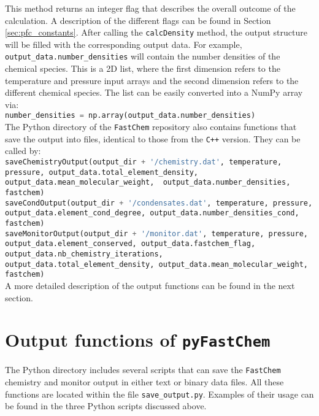 \documentclass[numbers=noenddot]{aux/fcmanual}
\newcommand{\fc}{\texttt{FastChem}\xspace}
\newcommand{\pfc}{\texttt{pyFastChem}\xspace}
\newcommand{\cpp}{\ttt{C++}\xspace}
\newcommand{\ttt}[1]{\texttt {#1}}
\begin{document}
This method returns an integer flag that describes the overall outcome of the calculation. A description of the different flags can be found in Section \ref{sec:pfc_constants}. After calling the \lstinline[language=Python]!calcDensity! method, the output structure will be filled with the corresponding output data. For example, \\
\lstinline[language=Python]!output_data.number_densities!
will contain the number densities of the chemical species. This is a 2D list, where the first dimension refers to the temperature and pressure input arrays and the second dimension refers to the different chemical species. The list can be easily converted into a NumPy array via:\\

\lstinline[language=Python]!number_densities = np.array(output_data.number_densities)!\\

The Python directory of the \fc repository also contains functions that save the output into files, identical to those from the \cpp version. They can be called by:\\

\lstinline[language=Python, breaklines, breakatwhitespace]!saveChemistryOutput(output_dir + '/chemistry.dat', temperature, pressure, output_data.total_element_density, output_data.mean_molecular_weight,  output_data.number_densities, fastchem)!\\

\lstinline[language=Python, breaklines, breakatwhitespace]!saveCondOutput(output_dir + '/condensates.dat', temperature, pressure, output_data.element_cond_degree, output_data.number_densities_cond, fastchem)!\\

\lstinline[language=Python, breaklines, breakatwhitespace]!saveMonitorOutput(output_dir + '/monitor.dat', temperature, pressure, output_data.element_conserved, output_data.fastchem_flag, output_data.nb_chemistry_iterations, output_data.total_element_density, output_data.mean_molecular_weight, fastchem)!\\

A more detailed description of the output functions can be found in the next section.


\section{Output functions of \pfc}

The Python directory includes several scripts that can save the \fc chemistry and monitor output in either text or binary data files. All these functions are located within the file \texttt{save\_output.py}. Examples of their usage can be found in the three Python scripts discussed above. \\
\end{document}

